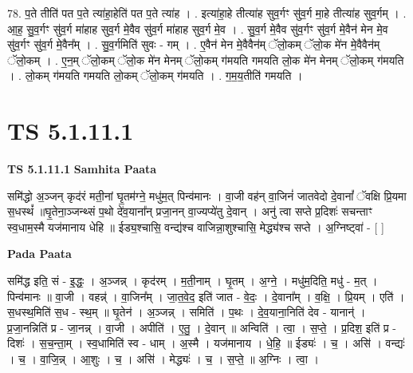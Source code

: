 \documentclass[17pt]{extarticle}
\begin{document}
78. प॒ते तीति॑ पत प॒ते त्या॑हा॒हेति॑ पत प॒ते त्या॑ह । . इत्या॑हा॒हे तीत्या॑ह सुव॒र्गꣳ सु॑व॒र्ग मा॒हे तीत्या॑ह सुव॒र्गम् । . आ॒ह॒ सु॒व॒र्गꣳ सु॑व॒र्ग मा॑हाह सुव॒र्ग मे॒वैव सु॑व॒र्ग मा॑हाह सुव॒र्ग मे॒व । . सु॒व॒र्ग मे॒वैव सु॑व॒र्गꣳ सु॑व॒र्ग मे॒वैन॑ मेन मे॒व सु॑व॒र्गꣳ सु॑व॒र्ग मे॒वैन᳚म् । . सु॒व॒र्गमिति॑ सुवः - गम् । . ए॒वैन॑ मेन मे॒वैवैन॑म् ॅलो॒कम् ॅलो॒क मे॑न मे॒वैवैन॑म् ॅलो॒कम् । . ए॒न॒म् ॅलो॒कम् ॅलो॒क मे॑न मेनम् ॅलो॒कम् ग॑मयति गमयति लो॒क मे॑न मेनम् ॅलो॒कम् ग॑मयति । . लो॒कम् ग॑मयति गमयति लो॒कम् ॅलो॒कम् ग॑मयति । . ग॒म॒य॒तीति॑ गमयति । \newline
\pagebreak
{}

\section{ TS 5.1.11.1 }

\textbf{TS 5.1.11.1 } \newline
\textbf{Samhita Paata} \newline

समि॑द्धो अ॒ञ्जन् कृद॑रं मती॒नां घृ॒तम॑ग्ने॒ मधु॑म॒त् पिन्व॑मानः । वा॒जी वह॑न् वा॒जिनं॑ जातवेदो दे॒वानां᳚ ॅवक्षि प्रि॒यमा स॒धस्थं᳚ ॥घृ॒तेना॒ञ्जन्थ्सं प॒थो दे॑व॒याना᳚न् प्रजा॒नन् वा॒ज्यप्ये॑तु दे॒वान् । अनु॑ त्वा सप्ते प्र॒दिशः॑ सचन्ताꣳ स्व॒धाम॒स्मै यज॑मानाय धेहि ॥ ईड्य॒श्चासि॒ वन्द्य॑श्च वाजिन्ना॒शुश्चासि॒ मेद्ध्य॑श्च सप्ते । अ॒ग्निष्ट्वा॑ - [  ] \newline

\textbf{Pada Paata} \newline

समि॑द्ध इति॒ सं - इ॒द्धः॒ । अ॒ञ्जन्न् । कृद॑रम् । म॒ती॒नाम् । घृ॒तम् । अ॒ग्ने॒ । मधु॑म॒दिति॒ मधु॑ - म॒त् । पिन्व॑मानः ॥ वा॒जी । वहन्न्॑ । वा॒जिन᳚म् । जा॒त॒वे॒द॒ इति॑ जात - वे॒दः॒ । दे॒वाना᳚म् । व॒क्षि॒ । प्रि॒यम् । एति॑ । स॒धस्थ॒मिति॑ स॒ध - स्थ॒म् ॥ घृ॒तेन॑ । अ॒ञ्जन्न् । समिति॑ । प॒थः । दे॒व॒याना॒निति॑ देव - यानान्॑ । प्र॒जा॒नन्निति॑ प्र - जा॒नन्न् । वा॒जी । अपीति॑ । ए॒तु॒ । दे॒वान् ॥ अन्विति॑ । त्वा॒ । स॒प्ते॒ । प्र॒दिश॒ इति॑ प्र - दिशः॑ । स॒च॒न्ता॒म् । स्व॒धामिति॑ स्व - धाम् । अ॒स्मै । यज॑मानाय । धे॒हि॒ ॥ ईड्यः॑ । च॒ । असि॑ । वन्द्यः॑ । च॒ । वा॒जि॒न्न् । आ॒शुः । च॒ । असि॑ । मेद्ध्यः॑ । च॒ । स॒प्ते॒ ॥ अ॒ग्निः । त्वा॒ ।  \newline
\end{document}
